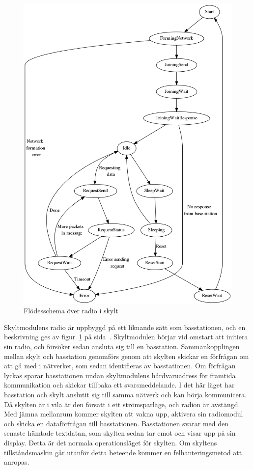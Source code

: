 \documentclass[a4paper,11pt]{article}
\begin{document}
\begin{figure}[H]
\begin{center}
\includegraphics[scale=0.35, angle=0]{skyltFSM.png}
\end{center}
\caption{Flödesschema över radio i skylt}
\label{fig:radio_skylt}
\end{figure}

Skyltmodulens radio är uppbyggd på ett liknande sätt som basstationen, och en beskrivning ges av figur~\ref{fig:radio_skylt} på sida~\pageref{fig:radio_skylt}. Skyltmodulen börjar vid omstart att initiera sin radio, och försöker sedan ansluta sig till en basstation. Sammankopplingen mellan skylt och basstation genomförs genom att skylten skickar en förfrågan om att gå med i nätverket, som sedan identifieras av basstationen. Om förfrågan lyckas sparar basstationen undan skyltmodulens hårdvaruadress för framtida kommunikation och skickar tillbaka ett svarsmeddelande. I det här läget har basstation och skylt anslutit sig till samma nätverk och kan börja kommunicera. Då skylten är i vila är den försatt i ett strömsparläge, och radion är avstängd. Med jämna mellanrum kommer skylten att vakna upp, aktivera sin radiomodul och skicka en dataförfrågan till basstationen. Basstationen svarar med den senaste hämtade textdatan, som skylten sedan tar emot och visar upp på sin display. Detta är det normala operationsläget för skylten. Om skyltens tillståndsmaskin går utanför detta beteende kommer en felhanteringsmetod att anropas. 
\end{document}
